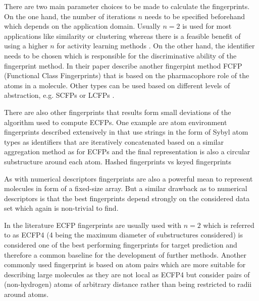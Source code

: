 There are two main parameter choices to be made to calculate the fingerprints. On the one hand, the number of iterations $n$ needs to be specified beforehand which depends on the application domain. Usually $n=2$ is used for most applications like similarity or clustering whereas there is a feasible benefit of using a higher $n$ for activity learning methods \cite{ECFP}.
On the other hand, the identifier needs to be chosen which is responsible for the discriminative  ability of the fingerprint method. In their paper \cite{ECFP} describe another fingerpint method FCFP (Functional Class Fingerprints) that is based on the pharmacophore role of the atoms in a molecule. Other types can be used based on different levels of abstraction, e.g. SCFPs \citep{SCFP} or LCFPs \citep{LCFP}.

There are also other fingerprints that results form small deviations of the algorithm used to compute ECFPs. One example are atom environment fingerprints described extensively in \cite{glen2006circular} that use strings in the form of Sybyl atom types as identifiers \citep{SCFP} that are iteratively concatenated based on a similar aggregation method as for ECFPs and the final representation is also a circular substructure around each atom. 
Hashed fingerprints vs keyed fingerprints

As with numerical descriptors fingerprints are also a powerful mean to represent molecules in form of a fixed-size array. But a similar drawback as to numerical descriptors is that the best fingerprints depend strongly on the considered data set which again is  non-trivial to find.

In the literature ECFP fingerprints are usually used with $n=2$ which is referred to as ECFP4 (4 being the maximum diameter of substructures considered) is considered one of the best performing fingerprints for target prediction \cite{awaleecfp4} and therefore a common baseline for the development of further methods. Another commonly used fingerprint is based on atom pairs \citep{atompairs} which are more suitable for describing large molecules as they are not local as ECFP4 but consider pairs of (non-hydrogen) atoms of arbitrary distance rather than being restricted to radii around atoms. 

